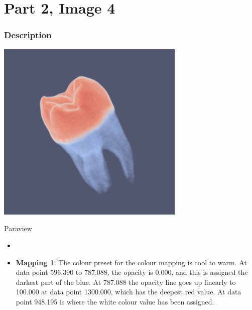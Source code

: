 \hypertarget{part-2-image-4}{%
	\section{Part 2, Image 4}\label{part-1-design-2}}

\centering


\hypertarget{description}{%
	\subsubsection{Description}\label{description}}

\begin{description}
	\item[Image:]
	\item\includegraphics[width=9cm]{Tooth2.png}
	
	\item[Tool:]
	\hfill \break
		Paraview
	\item[Visual Mappings:]
	\begin{itemize}
		\tightlist
		\item[ ]
	\end{itemize}
	\begin{itemize}
		\tightlist
		\item
		\textbf{Mapping 1}: 
		\hfill \break
			The colour preset for the colour mapping is cool to warm. At data point 596.390 to 787.088, the opacity is 0.000, and this is assigned the darkest part of the blue. At 787.088 the opacity line goes up linearly to 100.000 at data point 1300.000, which has the deepest red value. At data point 948.195 is where the white colour value has been assigned.
	\end{itemize}
	

\end{description}
